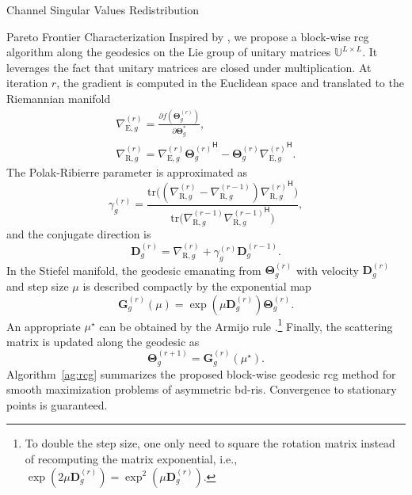 \documentclass[journal]{IEEEtran}
\begin{document}
\begin{section}{Channel Singular Values Redistribution}
\begin{subsection}{Pareto Frontier Characterization}
		Inspired by \cite{Abrudan2008,Abrudan2009}, we propose a block-wise \gls{rcg} algorithm along the geodesics on the Lie group of unitary matrices $\mathbb{U}^{L \times L}$.
		It leverages the fact that unitary matrices are closed under multiplication.
		At iteration $r$, the gradient is computed in the Euclidean space and translated to the Riemannian manifold \cite{Absil2009}
		\begin{gather}
			\nabla_{\mathrm{E},g}^{(r)} = \frac{\partial f(\mathbf{\Theta}_g^{(r)})}{\partial \mathbf{\Theta}_g^*},\label{eq:gradient_euclidean}\\
			\nabla_{\mathrm{R},g}^{(r)} = \nabla_{\mathrm{E},g}^{(r)} {\mathbf{\Theta}_g^{(r)}}^\mathsf{H} - \mathbf{\Theta}_g^{(r)} {\nabla_{\mathrm{E},g}^{(r)}}^\mathsf{H}.\label{eq:gradient_riemannian} %
		\end{gather}
		The Polak-Ribierre parameter \cite{Polak1969} is approximated as \cite{Abrudan2009}
		\begin{equation}
			\gamma_g^{(r)} = \frac{\mathrm{tr}\bigl((\nabla_{\mathrm{R},g}^{(r)} - \nabla_{\mathrm{R},g}^{(r-1)}) {\nabla_{\mathrm{R},g}^{(r)}}^\mathsf{H}\bigr)}{\mathrm{tr}\bigl(\nabla_{\mathrm{R},g}^{(r-1)} {\nabla_{\mathrm{R},g}^{(r-1)}}^\mathsf{H}\bigr)}, %
			\label{eq:parameter_cg}
		\end{equation}
		and the conjugate direction is
		\begin{equation}
			\mathbf{D}_g^{(r)} = \nabla_{\mathrm{R},g}^{(r)} + \gamma_g^{(r)} \mathbf{D}_g^{(r-1)}. %
			\label{eq:direction_cg}
		\end{equation}
		In the Stiefel manifold, the geodesic emanating from $\mathbf{\Theta}_g^{(r)}$ with velocity $\mathbf{D}_g^{(r)}$ and step size $\mu$ is described compactly by the exponential map \cite{Edelman1998}
		\begin{equation}
			\mathbf{G}_g^{(r)}(\mu) = \exp(\mu \mathbf{D}_g^{(r)}) \mathbf{\Theta}_g^{(r)}. %
			\label{eq:geodesic}
		\end{equation}
		An appropriate $\mu^\star$ can be obtained by the Armijo rule \cite{Armijo1966}.\footnote{To double the step size, one only need to square the rotation matrix instead of recomputing the matrix exponential, i.e., $\exp(2 \mu \mathbf{D}_g^{(r)}) = \exp^2(\mu \mathbf{D}_g^{(r)})$.}
		Finally, the scattering matrix is updated along the geodesic as
		\begin{equation}
			\mathbf{\Theta}_g^{(r+1)} = \mathbf{G}_g^{(r)}(\mu^\star).
			\label{eq:update_geodesic}
		\end{equation}
		Algorithm~\ref{ag:rcg} summarizes the proposed block-wise geodesic \gls{rcg} method for smooth maximization problems of asymmetric \gls{bd}-\gls{ris}.
		Convergence to stationary points is guaranteed.


\end{subsection}
\end{section}
\end{document}
